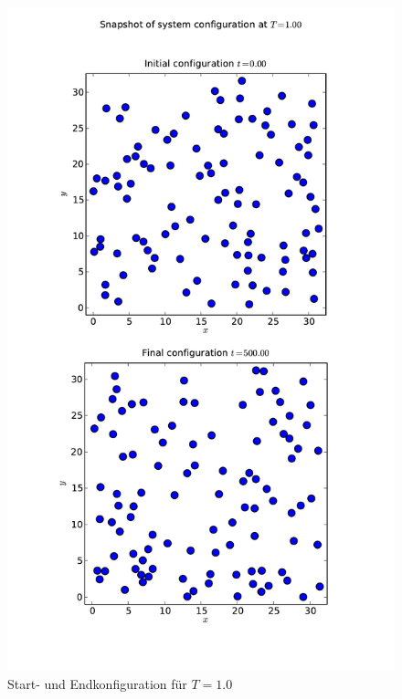 \documentclass[11pt,a4paper]{article}
\begin{document}
\begin{figure}[tbp]
\centering
\vspace*{-1cm}\includegraphics[width=14cm]{../snapshot_T_1_00}
\vspace*{-1.5cm} \caption{Start- und Endkonfiguration für $T=1.0$}\label{fig:config1}
\end{figure}
\end{document}
